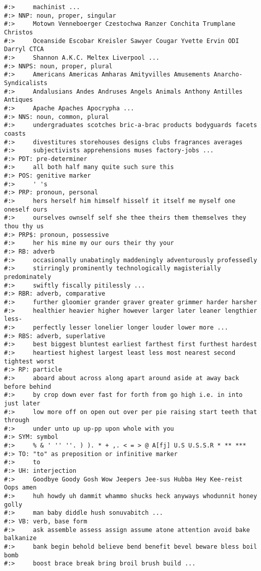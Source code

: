 \documentclass[
]{book}
\begin{document}
\begin{verbatim}
#:>     machinist ...
#:> NNP: noun, proper, singular
#:>     Motown Venneboerger Czestochwa Ranzer Conchita Trumplane Christos
#:>     Oceanside Escobar Kreisler Sawyer Cougar Yvette Ervin ODI Darryl CTCA
#:>     Shannon A.K.C. Meltex Liverpool ...
#:> NNPS: noun, proper, plural
#:>     Americans Americas Amharas Amityvilles Amusements Anarcho-Syndicalists
#:>     Andalusians Andes Andruses Angels Animals Anthony Antilles Antiques
#:>     Apache Apaches Apocrypha ...
#:> NNS: noun, common, plural
#:>     undergraduates scotches bric-a-brac products bodyguards facets coasts
#:>     divestitures storehouses designs clubs fragrances averages
#:>     subjectivists apprehensions muses factory-jobs ...
#:> PDT: pre-determiner
#:>     all both half many quite such sure this
#:> POS: genitive marker
#:>     ' 's
#:> PRP: pronoun, personal
#:>     hers herself him himself hisself it itself me myself one oneself ours
#:>     ourselves ownself self she thee theirs them themselves they thou thy us
#:> PRP$: pronoun, possessive
#:>     her his mine my our ours their thy your
#:> RB: adverb
#:>     occasionally unabatingly maddeningly adventurously professedly
#:>     stirringly prominently technologically magisterially predominately
#:>     swiftly fiscally pitilessly ...
#:> RBR: adverb, comparative
#:>     further gloomier grander graver greater grimmer harder harsher
#:>     healthier heavier higher however larger later leaner lengthier less-
#:>     perfectly lesser lonelier longer louder lower more ...
#:> RBS: adverb, superlative
#:>     best biggest bluntest earliest farthest first furthest hardest
#:>     heartiest highest largest least less most nearest second tightest worst
#:> RP: particle
#:>     aboard about across along apart around aside at away back before behind
#:>     by crop down ever fast for forth from go high i.e. in into just later
#:>     low more off on open out over per pie raising start teeth that through
#:>     under unto up up-pp upon whole with you
#:> SYM: symbol
#:>     % & ' '' ''. ) ). * + ,. < = > @ A[fj] U.S U.S.S.R * ** ***
#:> TO: "to" as preposition or infinitive marker
#:>     to
#:> UH: interjection
#:>     Goodbye Goody Gosh Wow Jeepers Jee-sus Hubba Hey Kee-reist Oops amen
#:>     huh howdy uh dammit whammo shucks heck anyways whodunnit honey golly
#:>     man baby diddle hush sonuvabitch ...
#:> VB: verb, base form
#:>     ask assemble assess assign assume atone attention avoid bake balkanize
#:>     bank begin behold believe bend benefit bevel beware bless boil bomb
#:>     boost brace break bring broil brush build ...

\end{verbatim}
\end{document}

